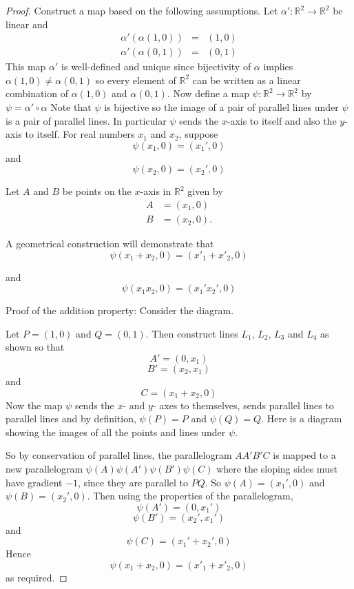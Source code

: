 \documentclass[honours]{UNSWthesis}
\newcommand{\R}{\mathbb{R}}
\newcommand{\1}{\mathbf{e}_{1}}
\newcommand{\2}{\mathbf{e}_{3}}
\newcommand{\3}{\mathbf{e}_{3}}
\begin{document}
\begin{proof}
Construct a map based on the following assumptions. Let $\alpha': \R^{2} \longrightarrow \R^{2}$ be linear and
\begin{eqnarray*}
\alpha'(\alpha(1,0))&=& (1,0)\\
\alpha'(\alpha(0,1)) &=& (0,1)
\end{eqnarray*}
This map $\alpha'$ is well-defined and unique since bijectivity of $\alpha$ implies $\alpha(1,0) \neq \alpha(0,1)$ so every element of $\R^{2}$ can be written as a linear combination of $\alpha(1,0)$ and $\alpha(0,1)$. 
Now define a map $\psi: \R^{2} \longrightarrow \R^{2}$ by $\psi= \alpha' \circ \alpha$
Note that $\psi$ is bijective so the image of a pair of parallel lines under $\psi$ is a pair of parallel lines. In particular $\psi$ sends the $x$-axis to itself and also the $y$-axis to itself. For real numbers $x_1$ and $x_2$, suppose $$\psi(x_{1},0)=(x_{1}',0)$$ and $$\psi(x_{2},0)=(x_{2}',0)$$

Let $A$ and $B$ be points on the $x$-axis in $\R^2$ given by 
\begin{align*}
A&= (x_1,0) \\
B&=(x_2,0).
\end{align*}

A geometrical construction will demonstrate that
\begin{equation}
\psi(x_{1}+x_{2},0)=(x'_{1}+x'_2,0)
\end{equation}

and 
\begin{equation}
\psi(x_{1}x_{2},0)=(x_{1}'x_{2}',0)
\end{equation}


Proof of the addition property:
Consider the diagram.



Let $P=(1,0)$ and $Q=(0,1)$. Then construct lines $L_{1}$, $L_{2}$, $L_{3}$ and $L_{4}$ as shown so that $$A'=(0,x_{1})$$ $$B'=(x_{2}, x_{1})$$ and $$C=(x_{1}+x_{2},0)$$ Now the map $\psi$ sends the $x$- and $y$- axes to themselves, sends parallel lines to parallel lines and by definition, $\psi(P)=P$ and $\psi(Q)=Q$. Here is a diagram showing the images of all the points and lines under $\psi$.



So by conservation of parallel lines, the parallelogram $AA'B'C$ is mapped to a new parallelogram $\psi(A)\psi(A')\psi(B')\psi(C)$ where the sloping sides must have gradient $-1$, since they are parallel to $PQ$. So $\psi(A)=(x_{1}',0)$ and $\psi(B)=(x_{2}',0)$. Then using the properties of the parallelogram, 
\[
\psi(A')=(0,x_{1}')
\]
\[
\psi(B')=(x_{2}',x_{1}')
\]
and 
\[
\psi(C)=(x_{1}'+x_{2}',0)
\]
Hence 
\begin{equation}\label{axisaddnmap}
\psi(x_{1}+x_{2},0)=(x'_{1}+x'_2,0)
\end{equation}
as required.


\end{proof}
\end{document}
